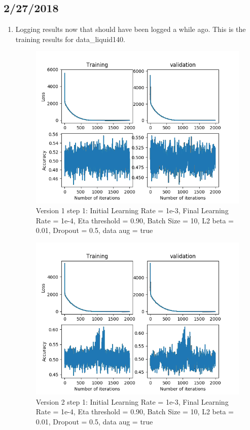 \documentclass[12pt,reqno]{amsart}
\numberwithin{equation}{section}
\begin{document}
\subsection{2/27/2018}
\begin{enumerate}
\item Logging results now that should have been logged a while ago.  This is the training results for data\_liquid140.  

\begin{figure}[H]
\centering
\includegraphics[scale=0.6]{data_liquid140_version1_step1}
\caption{Version 1 step 1: Initial Learning Rate = 1e-3, Final Learning Rate = 1e-4, Eta threshold = 0.90, Batch Size = 10, L2 beta = 0.01, Dropout = 0.5, data aug = true}
\end{figure}

\begin{figure}[H]
\centering
\includegraphics[scale=0.6]{data_liquid140_version2_step1}
\caption{Version 2 step 1: Initial Learning Rate = 1e-3, Final Learning Rate = 1e-4, Eta threshold = 0.90, Batch Size = 10, L2 beta = 0.01, Dropout = 0.5, data aug = true}
\end{figure}


\end{enumerate}
\end{document}
